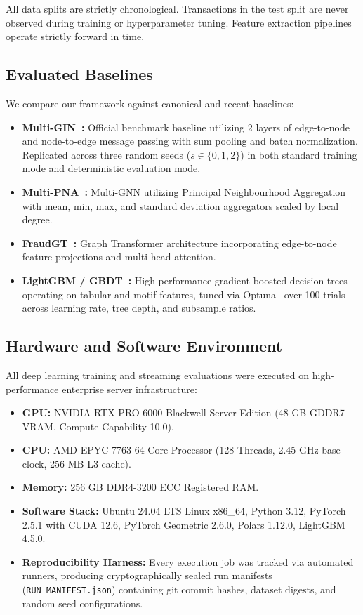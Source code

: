 \documentclass[pdflatex,sn-mathphys,Numbered]{sn-jnl}
\theoremstyle{thmstyleone}
\theoremstyle{thmstyletwo}
\theoremstyle{thmstylethree}
\begin{document}
All data splits are strictly chronological. Transactions in the test split are never observed during training or hyperparameter tuning. Feature extraction pipelines operate strictly forward in time.

\subsection{Evaluated Baselines}
We compare our framework against canonical and recent baselines:
\begin{itemize}
    \item \textbf{Multi-GIN~\cite{egressy2024multigraph}:} Official benchmark baseline utilizing 2 layers of edge-to-node and node-to-edge message passing with sum pooling and batch normalization. Replicated across three random seeds ($s \in \{0, 1, 2\}$) in both standard training mode and deterministic evaluation mode.
    \item \textbf{Multi-PNA~\cite{egressy2024multigraph}:} Multi-GNN utilizing Principal Neighbourhood Aggregation with mean, min, max, and standard deviation aggregators scaled by local degree.
    \item \textbf{FraudGT~\cite{lin2024fraudgt}:} Graph Transformer architecture incorporating edge-to-node feature projections and multi-head attention.
    \item \textbf{LightGBM / GBDT~\cite{ke2017lightgbm}:} High-performance gradient boosted decision trees operating on tabular and motif features, tuned via Optuna~\cite{akiba2019optuna} over 100 trials across learning rate, tree depth, and subsample ratios.
\end{itemize}

\subsection{Hardware and Software Environment}
All deep learning training and streaming evaluations were executed on high-performance enterprise server infrastructure:
\begin{itemize}
    \item \textbf{GPU:} NVIDIA RTX PRO 6000 Blackwell Server Edition (48 GB GDDR7 VRAM, Compute Capability 10.0).
    \item \textbf{CPU:} AMD EPYC 7763 64-Core Processor (128 Threads, 2.45 GHz base clock, 256 MB L3 cache).
    \item \textbf{Memory:} 256 GB DDR4-3200 ECC Registered RAM.
    \item \textbf{Software Stack:} Ubuntu 24.04 LTS Linux x86\_64, Python 3.12, PyTorch 2.5.1 with CUDA 12.6, PyTorch Geometric 2.6.0, Polars 1.12.0, LightGBM 4.5.0.
    \item \textbf{Reproducibility Harness:} Every execution job was tracked via automated runners, producing cryptographically sealed run manifests (\texttt{RUN\_MANIFEST.json}) containing git commit hashes, dataset digests, and random seed configurations.
\end{itemize}
\end{document}
